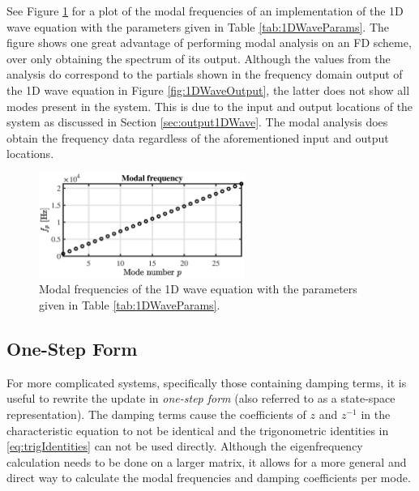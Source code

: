 {{See Figure \ref{fig:modalFreqs1Dwave} for a plot of the modal frequencies of an implementation of the 1D wave equation with the parameters given in Table \ref{tab:1DWaveParams}.
The figure shows one great advantage of performing modal analysis on an FD scheme, over only obtaining the spectrum of its output. Although the values from the analysis do correspond to the partials shown in the frequency domain output of the 1D wave equation in Figure \ref{fig:1DWaveOutput}, the latter does not show all modes present in the system. This is due to the input and output locations of the system as discussed in Section \ref{sec:output1DWave}. The modal analysis does obtain the frequency data regardless of the aforementioned input and output locations. 

\begin{figure}[h]
    \centering
    \includegraphics[width = 0.6\textwidth]{figures/analysis/1dmodes.eps}
    \caption{Modal frequencies of the 1D wave equation with the parameters given in Table \ref{tab:1DWaveParams}. \label{fig:modalFreqs1Dwave}}
\end{figure}

\subsection{One-Step Form}\label{sec:oneStepForm}
For more complicated systems, specifically those containing damping terms, it is useful to rewrite the update in \textit{one-step form} (also referred to as a state-space representation). The damping terms cause the coefficients of $z$ and $z^{-1}$ in the characteristic equation to not be identical and the trigonometric identities in \eqref{eq:trigIdentities} can not be used directly. Although the eigenfrequency calculation needs to be done on a larger matrix, it allows for a more general and direct way to calculate the modal frequencies and damping coefficients per mode. 

}}
